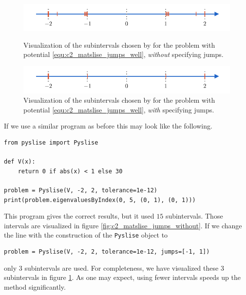 \begin{figure}
    \begin{center}
        \includegraphics[width=\textwidth]{img/chapter2/matslise_jumps_without.pdf}
    \end{center}
    \caption{Visualization of the subintervals chosen by  for the problem with potential \eqref{equ:c2_matslise_jumps_well}, \emph{without} specifying jumps.}
    \label{fig:c2_matslise_jumps_without}
    \vspace{8mm}
    \begin{center}
        \includegraphics[width=\textwidth]{img/chapter2/matslise_jumps_with.pdf}
    \end{center}
    \caption{Visualization of the subintervals chosen by  for the problem with potential \eqref{equ:c2_matslise_jumps_well}, \emph{with} specifying jumps.}
    \label{fig:c2_matslise_jumps_with}
\end{figure}

If we use a similar program as before this may look like the following.
\begin{verbatim}
from pyslise import Pyslise

def V(x):
    return 0 if abs(x) < 1 else 30

problem = Pyslise(V, -2, 2, tolerance=1e-12)
print(problem.eigenvaluesByIndex(0, 5, (0, 1), (0, 1)))
\end{verbatim}
This program gives the correct results, but it used $15$ subintervals. Those intervals are visualized in figure \ref{fig:c2_matslise_jumps_without}. If we change the line with the construction of the \texttt{Pyslise} object to
\begin{verbatim}
problem = Pyslise(V, -2, 2, tolerance=1e-12, jumps=[-1, 1])
\end{verbatim}
only $3$ subintervals are used. For completeness, we have visualized these 3 subintervals in figure \ref{fig:c2_matslise_jumps_with}. As one may expect, using fewer intervals speeds up the method significantly.

